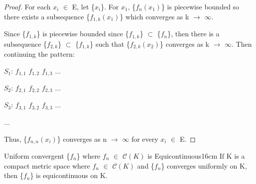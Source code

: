     \vspace{0.1cm}

    \begin{proof}
        For each $x_i$ $\in$ E, let \{$x_i$\}.
        For $x_1$, \{$f_n(x_1)$\} is piecewise bounded so there exists a
        subsequence \{$f_{1,k}(x_1)$\} which converges as k $\rightarrow$ $\infty$.
        
        Since \{$f_{1,k}$\} is piecewise bounded since \{$f_{1,k}$\}
        $\subset$ \{$f_n$\}, then there is a subsequence
        \{$f_{2,k}$\} $\subset$ \{$f_{1,k}$\} such that \{$f_{2,k}(x_2)$\}
        converges as k $\rightarrow$ $\infty$.
        Then continuing the pattern:

        \hspace{0.5cm}
        $S_1$:
        \hspace{1cm}
        $f_{1,1}$
        \hspace{1cm}
        $f_{1,2}$
        \hspace{1cm}
        $f_{1,3}$
        \hspace{1cm}
        ...

        \hspace{0.5cm}
        $S_2$:
        \hspace{1cm}
        $f_{2,1}$
        \hspace{1cm}
        $f_{2,2}$
        \hspace{1cm}
        $f_{2,3}$
        \hspace{1cm}
        ...

        \hspace{0.5cm}
        $S_3$:
        \hspace{1cm}
        $f_{3,1}$
        \hspace{1cm}
        $f_{3,2}$
        \hspace{1cm}
        $f_{3,3}$
        \hspace{1cm}
        ...

        \hspace{0.5cm}
        ...
    
        Thus, \{$f_{n,n}(x_i)$\} converges as n $\rightarrow$ $\infty$ for
        every $x_i$ $\in$ E.
    \end{proof}

    \newpage



    \begin{wtheorem}{Uniform convergent \{$f_n$\} where $f_n$ $\in$ $\mathscr{C}(K)$
    is Equicontinuous}{16cm}
        If K is a compact metric space where $f_n$ $\in$ $\mathscr{C}(K)$ and
        \{$f_n$\} converges uniformly on K, then \{$f_n$\} is equicontinuous on K.
    \end{wtheorem}

